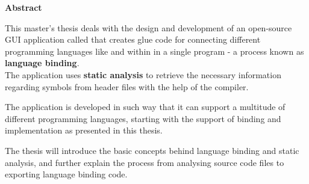 \thispagestyle{empty}
\textbf{Abstract}

This master's thesis deals with the design and development of an open-source GUI application called  that creates glue code for connecting different programming languages like  and  within in a single program - a process known as \textbf{language binding}.\\
The application uses \textbf{static analysis} to retrieve the necessary information regarding symbols from  header files with the help of the   compiler.

The application is developed in such way that it can support a multitude of different programming languages, starting with the support of binding  and  implementation  as presented in this thesis.

The thesis will introduce the basic concepts behind language binding and static analysis, and further explain the process from analysing source code files to exporting language binding code.